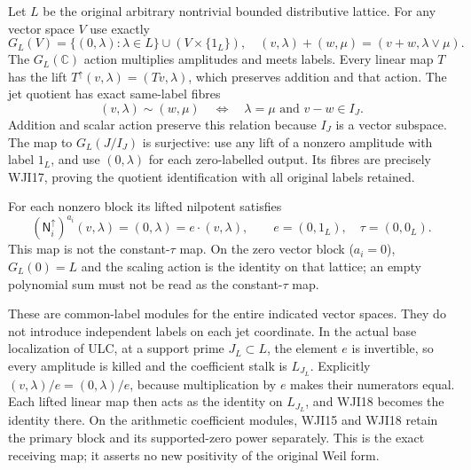 \documentclass[11pt]{article}
\begin{document}
Let $L$ be the original arbitrary nontrivial bounded
distributive lattice. For any vector space $V$ use exactly
\begin{equation}\tag{WJI16}
 G_L(V)=\{(0,\lambda):\lambda\in L\}\cup
                        (V\times\{1_L\}),\quad
 (v,\lambda)+(w,\mu)=(v+w,\lambda\vee\mu).
\end{equation}
The $G_L(\mathbb C)$ action multiplies amplitudes and meets
labels. Every linear map $T$ has the lift
$T^\uparrow(v,\lambda)=(Tv,\lambda)$, which preserves
addition and that action. The jet quotient has exact
same-label fibres
\begin{equation}\tag{WJI17}
 (v,\lambda)\sim(w,\mu)
       \quad\Longleftrightarrow\quad
       \lambda=\mu\text{ and }v-w\in I_J.
\end{equation}
Addition and scalar action preserve this relation because
$I_J$ is a vector subspace. The map to $G_L(J/I_J)$ is
surjective: use any lift of a nonzero amplitude with label
$1_L$, and use $(0,\lambda)$ for each zero-labelled output.
Its fibres are precisely WJI17, proving the quotient
identification with all original labels retained.

For each nonzero block its lifted nilpotent satisfies
\begin{equation}\tag{WJI18}
 (\mathsf N_i^\uparrow)^{a_i}(v,\lambda)
     =(0,\lambda)=e\cdot(v,\lambda),
 \qquad e=(0,1_L),\quad\tau=(0,0_L).
\end{equation}
This map is not the constant-$\tau$ map. On the zero vector
block ($a_i=0$), $G_L(0)=L$ and the scaling action is the
identity on that lattice; an empty polynomial sum must not
be read as the constant-$\tau$ map.

These are common-label modules for the entire indicated
vector spaces. They do not introduce independent labels on
each jet coordinate. In the actual base localization of ULC,
at a support prime $J_L\subset L$, the element $e$ is
invertible, so every amplitude is killed and the coefficient
stalk is $L_{J_L}$. Explicitly
$(v,\lambda)/e=(0,\lambda)/e$, because multiplication
by $e$ makes their numerators equal. Each lifted linear
map then acts as the identity on $L_{J_L}$, and WJI18
becomes the identity there. On the arithmetic coefficient
modules, WJI15 and WJI18 retain the primary block and its
supported-zero power separately. This is the exact receiving
map; it asserts no new positivity of the original Weil form.

\clearpage

\end{document}
